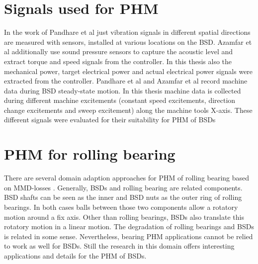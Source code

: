 \section{Signals used for PHM}
In the work of Pandhare et al \cite{Pandhare2021} just vibration signals in different spatial directions are measured with sensors, installed at various locations on the BSD. Azamfar et al \cite{AZAMFAR2020103932} additionally use sound pressure sensors to capture the acoustic level and extract torque and speed signals from the controller. In this thesis also the mechanical power, target electrical power and actual electrical power signals were extracted from the controller. Pandhare et al and Azamfar et al record machine data during BSD steady-state motion. In this thesis machine data is collected during different machine excitements (constant speed excitements, direction change excitements and sweep excitement) along the machine tools X-axis. These different signals were evaluated for their suitability for PHM of BSDs

\begin{comment}
Both Pandhare et al \cite{Pandhare2021} and Azamfar et al \cite{AZAMFAR2020103932} feed the data recorded during BSD steady-state motion as one single input to their models. During the phases of constant BSD motion, the amplitude of the signals changess. Azamfar et al assume that the shorter sequences created by a windowing function just capture limited information about these changes and are therefore not a proper tool for PHM \cite{AZAMFAR2020103932}. In the thesis a windowing function was evaluated for the PHM of BSDs. Windowing functions make the BSD experiments less dependent from specific BSD excitements. When beeing able to check the BSD degradation with short recorded windows, one can make statements about the BSD health status with data redcorded in real time use. Extra experiments 
\end{comment}

\section{PHM for rolling bearing}
There are several domain adaption approaches for PHM of rolling bearing based on MMD-losses \cite{AN201942} \cite{Li2018} \cite{Guo2019} \cite{Singh2019} \cite{Kang2020}. Generally, BSDs and rolling bearing are related components. BSD shafts can be seen as the inner and BSD nuts as the outer ring of rolling bearings. In both cases balls between those two components allow a rotatory motion around a fix axis. Other than rolling bearings, BSDs also translate this rotatory motion in a linear motion. The degradation of rolling bearings and BSDs is related in some sense. Nevertheless, bearing PHM applications cannot be relied to work as well for BSDs. Still the research in this domain offers interesting applications and details for the PHM of BSDs. 

